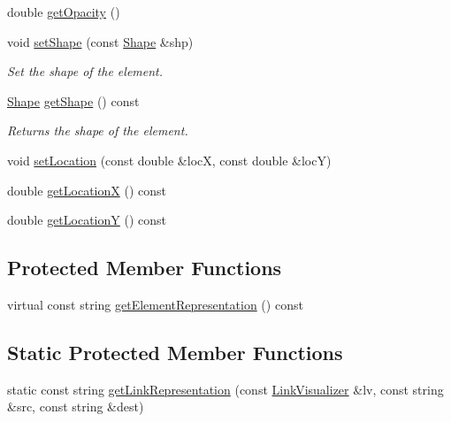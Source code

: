 \begin{DoxyCompactItemize}
\item 
double \hyperlink{classbridges_1_1datastructure_1_1_element_acf14bfc12da42565b237a7bd79bd36c2}{get\+Opacity} ()
\item 
void \hyperlink{classbridges_1_1datastructure_1_1_element_a1ef398bf1027244a624575e58a569ed9}{set\+Shape} (const \hyperlink{namespacebridges_1_1datastructure_a3408f5f44d9c6062e5f3adb7e1bbb7f0}{Shape} \&shp)
\begin{DoxyCompactList}\small\item\em Set the shape of the element. \end{DoxyCompactList}\item 
\hyperlink{namespacebridges_1_1datastructure_a3408f5f44d9c6062e5f3adb7e1bbb7f0}{Shape} \hyperlink{classbridges_1_1datastructure_1_1_element_acb8680aa406733d36411fd189017706c}{get\+Shape} () const
\begin{DoxyCompactList}\small\item\em Returns the shape of the element. \end{DoxyCompactList}\item 
void \hyperlink{classbridges_1_1datastructure_1_1_element_af3af017c9d6efcbc2124d0231b57e7a6}{set\+Location} (const double \&locX, const double \&locY)
\item 
double \hyperlink{classbridges_1_1datastructure_1_1_element_a471f2f69147deb0f514bb9720e0e18ea}{get\+LocationX} () const
\item 
double \hyperlink{classbridges_1_1datastructure_1_1_element_a6394039086bc1f27f2e6adf73294a74b}{get\+LocationY} () const
\end{DoxyCompactItemize}
\subsection*{Protected Member Functions}
\begin{DoxyCompactItemize}
\item 
virtual const string \hyperlink{classbridges_1_1datastructure_1_1_element_a285fc51d6dfcb8bff2d72f7e4addfe6d}{get\+Element\+Representation} () const
\end{DoxyCompactItemize}
\subsection*{Static Protected Member Functions}
\begin{DoxyCompactItemize}
\item 
static const string \hyperlink{classbridges_1_1datastructure_1_1_element_a0d43c0aaa96192b49dfc0a499d63a325}{get\+Link\+Representation} (const \hyperlink{classbridges_1_1datastructure_1_1_link_visualizer}{Link\+Visualizer} \&lv, const string \&src, const string \&dest)
\end{DoxyCompactItemize}
